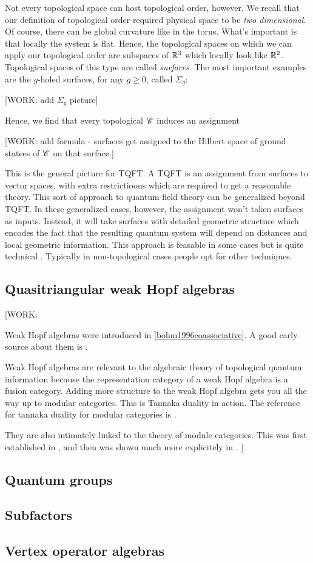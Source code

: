 Not every topological space can host topological order, however. We recall that our definition of topological order required physical space to be \textit{two dimensional}. Of course, there can be global curvature like in the torus. What's important is that locally the system is flat. Hence, the topological spaces on which we can apply our topological order are subspaces of $\mathbb{R}^3$ which locally look like $\mathbb{R}^2$. Topological spaces of this type are called \textit{surfaces}. The most important examples are the $g$-holed surfaces, for any $g\geq 0$, called $\Sigma_g$:

[WORK: add $\Sigma_g$ picture]

Hence, we find that every topological $\mathscr{C}$ induces an assignment

[WORK: add formula - surfaces get assigned to the Hilbert space of ground statees of $\mathscr{C}$ on that surface.]

This is the general picture for TQFT. A TQFT is an assignment from surfaces to vector spaces, with extra restrictioons which are required to get a reasonable theory. This sort of approach to quantum field theory can be generalized beyond TQFT. In these generalized cases, however, the assignment won't taken surfaces as inputs. Instead, it will take surfaces with detailed geometric structure which encodes the fact that the resulting quantum system will depend on distances and local geometric information. This approach is feasable in some cases but is quite technical \cite{segal1988definition}. Typically in non-topological cases people opt for other techniques.

\subsection{Quasitriangular weak Hopf algebras}

[WORK:

Weak Hopf algebras were introduced in \ref{bohm1996coassociative}. A good early source about them is \cite{nikshych2004semisimple}.

Weak Hopf algebras are relevant to the algebraic theory of topological quantum information because the representation category of a weak Hopf algebra is a fusion category. Adding more structure to the weak Hopf algebra gets you all the way up to modular categories. This is Tannaka duality in action. The reference for tannaka duality for modular categories is \cite{pfeiffer2009tannaka}.

They are also intimately linked to the theory of module categories. This was first established in \cite{ostrik2003module}, and then was shown much more explicitely in \cite{kitaev2012models}.
]

\subsection{Quantum groups}

\subsection{Subfactors}

\subsection{Vertex operator algebras}